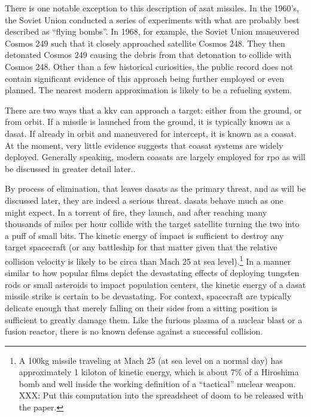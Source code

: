 There is one notable exception to this description of \ac{asat}
missiles.  In the 1960's, the Soviet Union conducted a series of
experiments with what are probably best described as ``flying
bombs''.\cite[xxx]{brian} In 1968, for example, the Soviet Union
maneuvered Cosmos 249 such that it closely approached satellite Cosmos
248.\cite[p02-03]{brian} They then detonated Cosmos 249 causing the
debris from that detonation to collide with Cosmos
248.\cite[p02-03]{brian} Other than a few historical curiosities, the
public record does not contain significant evidence of this approach
being further employed or even planned.  The nearest modern
approximation is likely to be a refueling system.

There are two ways that a \ac{kkv} can approach a target: either from
the ground, or from orbit.\cite[overview of asat missile paper
  needed]{xxx} If a missile is launched from the ground, it is
typically known as a \acf{dasat}.\cite[definition from brian?]{xxx} If
already in orbit and maneuvered for intercept, it is known as a
\acf{coasat}.\cite[definition from brian?]{xxx} At the moment, very
little evidence suggests that \ac{coasat} systems are widely deployed.
Generally speaking, modern \acp{coasat} are largely employed for
\ac{rpo} as will be discussed in greater detail
later.\cite[xxx]{brian}.

By process of elimination, that leaves \acp{dasat} as the primary
threat, and as will be discussed later, they are indeed a serious
threat.  \acp{dasat} behave much as one might expect.  In a torrent of
fire, they launch, and after reaching many thousands of miles per hour
collide with the target satellite turning the two into a puff of small
bits.\cite[kkv impact simulation]{xxx} The kinetic energy of impact is
sufficient to destroy any target spacecraft (or any battleship for
that matter given that the relative collision velocity is likely to be
circa than Mach 25 at sea level).\footnote{A 100kg missile traveling
at Mach 25 (at sea level on a normal day) has approximately 1 kiloton
of kinetic energy, which is about 7\% of a Hiroshima bomb and well
inside the working definition of a ``tactical'' nuclear weapon. XXX:
Put this computation into the spreadsheet of doom to be released with
the paper.} In a manner similar to how popular films depict the
devastating effects of deploying tungsten rods or small asteroids to
impact population centers, the kinetic energy of a \ac{dasat} missile
strike is certain to be devastating.  For context, spacecraft are
typically delicate enough that merely falling on their sides from a
sitting position is sufficient to greatly damage them.\cite{whoopsies}
Like the furious plasma of a nuclear blast or a fusion reactor, there
is no known defense against a successful collision.


